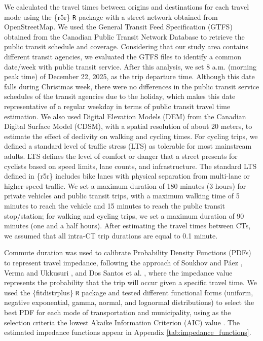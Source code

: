 \documentclass[preprint, 3p,
authoryear]{elsarticle} %
\begin{document}
We calculated the travel times between origins and destinations for each
travel mode using the \{r5r\} \texttt{R} package \citep{pereira2021a}
with a street network obtained from OpenStreetMap. We used the General
Transit Feed Specification (GTFS) obtained from the Canadian Public
Transit Network Database \citep{statisticscanada} to retrieve the public
transit schedule and coverage. Considering that our study area contains
different transit agencies, we evaluated the GTFS files to identify a
common date/week with public transit service. After this analysis, we
set 8 a.m. (morning peak time) of December 22, 2025, as the trip
departure time. Although this date falls during Christmas week, there
were no differences in the public transit service schedules of the
transit agencies due to the holiday, which makes this date
representative of a regular weekday in terms of public transit travel
time estimation. We also used Digital Elevation Models (DEM) from the
Canadian Digital Surface Model (CDSM), with a spatial resolution of
about 20 meters, to estimate the effect of declivity on walking and
cycling times. For cycling trips, we defined a standard level of traffic
stress (LTS) as tolerable for most mainstream adults. LTS defines the
level of comfort or danger that a street presents for cyclists based on
speed limits, lane counts, and infrastructure. The standard LTS defined
in \{r5r\} \citep{pereira2021a} includes bike lanes with physical
separation from multi-lane or higher-speed traffic. We set a maximum
duration of 180 minutes (3 hours) for private vehicles and public
transit trips, with a maximum walking time of 5 minutes to reach the
vehicle and 15 minutes to reach the public transit stop/station; for
walking and cycling trips, we set a maximum duration of 90 minutes (one
and a half hours). After estimating the travel times between CTs, we
assumed that all intra-CT trip durations are equal to 0.1 minute.

Commute duration was used to calibrate Probability Density Functions
(PDFs) to represent travel impedance, following the approach of Soukhov
and Páez \citeyearpar{soukhov2024a}, Verma and Ukkusuri
\citeyearpar{verma2025}, and Dos Santos et al.
\citeyearpar{dossantos2026}, where the impedance value represents the
probability that the trip will occur given a specific travel time. We
used the \{fitdistrplus\} \texttt{R} package
\citep{delignette2015fitdistrplus} and tested different functional forms
(uniform, negative exponential, gamma, normal, and lognormal
distributions) to select the best PDF for each mode of transportation
and municipality, using as the selection criteria the lowest Akaike
Information Criterion (AIC) value \citep{akaike1974}. The estimated
impedance functions appear in Appendix \ref{tab:impedance_functions}.
\end{document}
